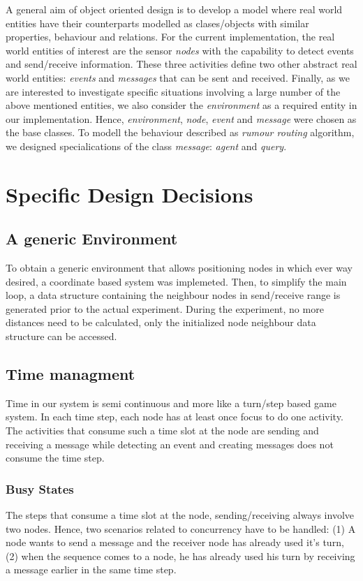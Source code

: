 \documentclass[a4paper,11pt,twoside]{article}
\begin{document}
A general aim of object oriented design is to develop a model where
real world entities have their counterparts modelled as clases/objects
with similar properties, behaviour and relations. For the current
implementation, the real world entities of interest are the sensor
\textit{nodes} with the capability to detect events and send/receive
information. These three activities define two other abstract real
world entities: \textit{events} and \textit{messages} that can be sent
and received. Finally, as we are interested to investigate specific
situations involving a large number of the above mentioned entities,
we also consider the \textit{environment} as a required entity in our
implementation. Hence, \textit{environment}, \textit{node},
\textit{event} and \textit{message} were chosen as the base
classes. To modell the behaviour described as \textit{rumour routing} algorithm,
we designed specialications of the class \textit{message}:
\textit{agent} and \textit{query}. 

\section{Specific Design Decisions}
\subsection{A generic Environment}
To obtain a generic environment that allows positioning nodes in which
ever way desired, a coordinate based system was implemeted. Then, to
simplify the main loop, a data structure containing the
neighbour nodes in send/receive range is generated prior to the actual
experiment. During the experiment, no more distances need to be
calculated, only the initialized node neighbour data structure can be accessed.

\subsection{Time managment}
Time in our system is semi continuous and more like a turn/step based
game system. In each time step, each node has at least once focus to
do one activity. The activities that consume such a time slot at the
node are sending and receiving a message while detecting an event and
creating messages does not consume the time step.

\subsubsection{Busy States}
The steps that consume a time slot at the node, sending/receiving
always involve two nodes. Hence, two scenarios related to concurrency
have to be handled: (1) A node wants to send a message and the 
receiver node has already used it's turn, (2) when the sequence comes
to a node, he has already used his turn by receiving a message earlier
in the same time step.
\end{document}
